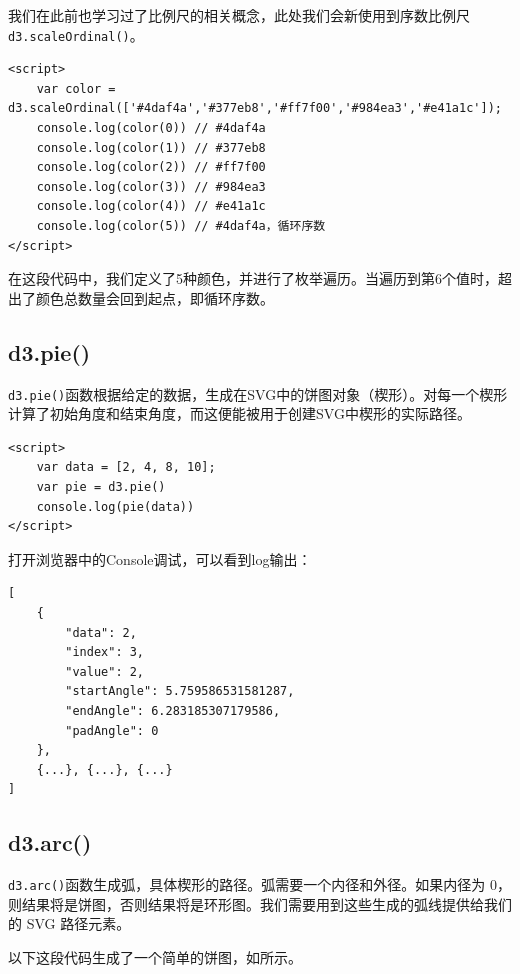 我们在此前也学习过了比例尺的相关概念，此处我们会新使用到序数比例尺\verb|d3.scaleOrdinal()|。

\begin{verbatim}
<script>
    var color = d3.scaleOrdinal(['#4daf4a','#377eb8','#ff7f00','#984ea3','#e41a1c']);
    console.log(color(0)) // #4daf4a
    console.log(color(1)) // #377eb8
    console.log(color(2)) // #ff7f00
    console.log(color(3)) // #984ea3
    console.log(color(4)) // #e41a1c
    console.log(color(5)) // #4daf4a，循环序数
</script>
\end{verbatim}

在这段代码中，我们定义了5种颜色，并进行了枚举遍历。当遍历到第6个值时，超出了颜色总数量会回到起点，即循环序数。

\subsection{d3.pie()}

\verb|d3.pie()|函数根据给定的数据，生成在SVG中的饼图对象（楔形）。对每一个楔形计算了初始角度和结束角度，而这便能被用于创建SVG中楔形的实际路径。

\begin{verbatim}
<script>
    var data = [2, 4, 8, 10];
    var pie = d3.pie()
    console.log(pie(data))
</script>
\end{verbatim}

打开浏览器中的Console调试，可以看到log输出：

\begin{verbatim}
[
    {
        "data": 2,
        "index": 3,
        "value": 2,
        "startAngle": 5.759586531581287,
        "endAngle": 6.283185307179586,
        "padAngle": 0
    },
    {...}, {...}, {...}
]
\end{verbatim}

\subsection{d3.arc()}

\verb|d3.arc()|函数生成弧，具体楔形的路径。弧需要一个内径和外径。如果内径为 0，则结果将是饼图，否则结果将是环形图。我们需要用到这些生成的弧线提供给我们的 SVG 路径元素。 

以下这段代码生成了一个简单的饼图，如所示。

